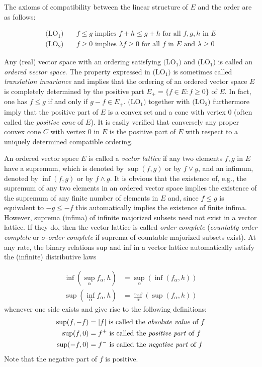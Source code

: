 The axioms of compatibility between the linear structure of $ E $ and the order are as follows:

\begin{align*}
\text{(LO$_{1}$)} & \quad f \leq g \text{ implies } f + h \leq g + h \text{ for all } f, g, h \text{ in } E \\
\text{(LO$_{2}$)} & \quad f \geq 0 \text{ implies } \lambda f \geq 0 \text{ for all } f \text{ in } E \text{ and } \lambda \geq 0
\end{align*}

Any (real) vector space with an ordering satisfying $ \text{(LO$_{1}$)} $ and $ \text{(LO$_{1}$)} $ is called an \emph{ordered vector space}.
The property expressed in $\text{(LO$_{1}$)}$ is sometimes called \emph{translation invariance} and implies that the ordering of an ordered vector space $ E $ is completely determined by the positive part $ E_{+} = \{f \in E \colon f \geq 0\} $ of $ E $.
In fact, one has $ f \leq g $ if and only if $ g - f \in E_{+} $.
$ \text{(LO$_{1}$)} $ together with $ \text{(LO$_{2}$)} $ furthermore imply that the positive part of $ E $ is a convex set and a cone with vertex $ 0 $ (often called the \emph{positive cone} of $ E $).
It is easily verified that conversely any proper convex cone $ C $ with vertex $ 0 $ in $ E $ is the positive part of $ E $ with respect to a uniquely determined compatible ordering.

An ordered vector space $ E $ is called a \emph{vector lattice} if any two elements $ f, g $ in $ E $ have a supremum, which is denoted by $ \sup(f,g) $ or by $ f \vee g $, and an infimum, denoted by $ \inf(f,g) $ or by $ f \wedge g $.
It is obvious that the existence of, e.g., the supremum of any two elements in an ordered vector space implies the existence of the supremum of any finite number of elements in $ E $ and, since $ f \leq g $ is equivalent to $ -g \leq -f $ this automatically implies the existence of finite infima.
However, suprema (infima) of infinite majorized subsets need not exist in a vector lattice.
If they do, then the vector lattice is called \emph{order complete} (\emph{countably order complete} or \emph{$ \sigma $-order complete} if suprema of countable majorized subsets exist).
At any rate, the binary relations sup and inf in a vector lattice automatically satisfy the (infinite) distributive laws

\begin{align*}
\inf(\sup_{\alpha}f_{\alpha},h) & = \sup_{\alpha}(\inf(f_{\alpha},h)) \\
\sup(\inf_{\alpha}f_{\alpha},h) & = \inf_{\alpha}(\sup(f_{\alpha},h))
\end{align*}
\pagebreak
whenever one side exists and give rise to the following definitions:
\begin{align*}
\sup(f,-f) &= |f| \text{ is called the \emph{absolute value} of } f \\
\sup(f,0) &= f^{+} \text{ is called the \emph{positive part} of } f \\
\sup(-f,0) &= f^{-} \text{ is called the \emph{negative part} of } f
\end{align*}
Note that the negative part of $ f $ is positive.

